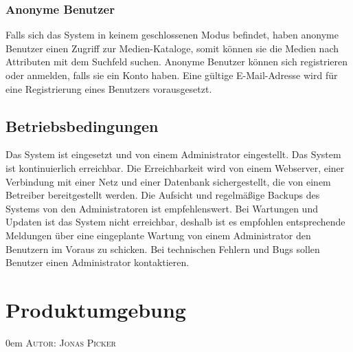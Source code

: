 \documentclass{article}
\makeatletter
\newcommand{\sectionauthor}[1]{
	{\parindent 0em \large \scshape Autor: #1 \par \nobreak \vspace*{2em}}
	\@afterheading
}
\makeatother
\begin{document}
\subsubsection{Anonyme Benutzer}
Falls sich das System in keinem geschlossenen Modus befindet, haben anonyme Benutzer einen Zugriff zur Medien-Kataloge, somit können sie die Medien nach Attributen mit dem Suchfeld suchen. Anonyme Benutzer können sich registrieren oder anmelden, falls sie ein Konto haben. Eine gültige E-Mail-Adresse wird für eine Registrierung eines Benutzers vorausgesetzt. 
\subsection{Betriebsbedingungen}
Das System ist eingesetzt und von einem Administrator eingestellt. Das System ist kontinuierlich erreichbar. Die Erreichbarkeit wird von einem Webserver, einer Verbindung mit einer Netz und einer Datenbank sichergestellt, die von einem Betreiber bereitgestellt werden. Die Aufsicht und regelmäßige Backups des Systems von den Administratoren ist empfehlenswert. Bei Wartungen und Updaten ist das System nicht erreichbar, deshalb ist es empfohlen entsprechende Meldungen über eine eingeplante Wartung von einem Administrator den Benutzern im Voraus zu schicken. Bei technischen Fehlern und Bugs sollen Benutzer einen Administrator kontaktieren.

\section{Produktumgebung} %
\sectionauthor{Jonas Picker}
\end{document}
